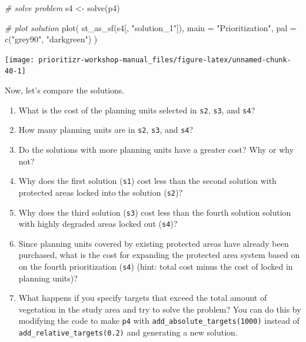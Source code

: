 \documentclass[
  12pt,
]{book}
\makeatletter
\newenvironment{Shaded}{\begin{snugshade}}{\end{snugshade}}
\newcommand{\AttributeTok}[1]{\textcolor[rgb]{0.77,0.63,0.00}{#1}}
\newcommand{\CommentTok}[1]{\textcolor[rgb]{0.56,0.35,0.01}{\textit{#1}}}
\newcommand{\FunctionTok}[1]{\textcolor[rgb]{0.00,0.00,0.00}{#1}}
\newcommand{\NormalTok}[1]{#1}
\newcommand{\OtherTok}[1]{\textcolor[rgb]{0.56,0.35,0.01}{#1}}
\newcommand{\StringTok}[1]{\textcolor[rgb]{0.31,0.60,0.02}{#1}}
\providecommand{\tightlist}{%
  \setlength{\itemsep}{0pt}\setlength{\parskip}{0pt}}
\newenvironment{kframe}{%
\medskip{}
\setlength{\fboxsep}{.8em}
 \def\at@end@of@kframe{}%
 \ifinner\ifhmode%
  \def\at@end@of@kframe{\end{minipage}}%
  \begin{minipage}{\columnwidth}%
 \fi\fi%
 \def\FrameCommand##1{\hskip\@totalleftmargin \hskip-\fboxsep
 \colorbox{shadecolor}{##1}\hskip-\fboxsep
     \hskip-\linewidth \hskip-\@totalleftmargin \hskip\columnwidth}%
 \MakeFramed {\advance\hsize-\width
   \@totalleftmargin\z@ \linewidth\hsize
   \@setminipage}}%
 {\par\unskip\endMakeFramed%
 \at@end@of@kframe}
\newenvironment{rmdblock}[1]
  {
  \begin{itemize}
  \renewcommand{\labelitemi}{
    \raisebox{-.7\height}[0pt][0pt]{
      {\setkeys{Gin}{width=3em,keepaspectratio}\texttt{[image: images/\#1]}}
    }
  }
  \setlength{\fboxsep}{1em}
  \begin{kframe}
  \item
  }
  {
  \end{kframe}
  \end{itemize}
  }
\newenvironment{rmdquestion}
  {\begin{rmdblock}{question}}
  {\end{rmdblock}}
\makeatother
\begin{document}
\begin{Shaded}
\begin{Highlighting}[]
\CommentTok{\# solve problem}
\NormalTok{s4 }\OtherTok{\textless{}{-}} \FunctionTok{solve}\NormalTok{(p4)}

\CommentTok{\# plot solution}
\FunctionTok{plot}\NormalTok{(}
  \FunctionTok{st\_as\_sf}\NormalTok{(s4[, }\StringTok{"solution\_1"}\NormalTok{]), }\AttributeTok{main =} \StringTok{"Prioritization"}\NormalTok{,}
  \AttributeTok{pal =} \FunctionTok{c}\NormalTok{(}\StringTok{"grey90"}\NormalTok{, }\StringTok{"darkgreen"}\NormalTok{)}
\NormalTok{)}
\end{Highlighting}
\end{Shaded}

\begin{center}\texttt{[image: prioritizr-workshop-manual\_files/figure-latex/unnamed-chunk-40-1]} \end{center}

\clearpage

Now, let's compare the solutions.

\begin{rmdquestion}
\begin{enumerate}
\def\labelenumi{\arabic{enumi}.}
\tightlist
\item
  What is the cost of the planning units selected in \texttt{s2}, \texttt{s3}, and \texttt{s4}?
\item
  How many planning units are in \texttt{s2}, \texttt{s3}, and \texttt{s4}?
\item
  Do the solutions with more planning units have a greater cost? Why or why not?
\item
  Why does the first solution (\texttt{s1}) cost less than the second solution with protected areas locked into the solution (\texttt{s2})?
\item
  Why does the third solution (\texttt{s3}) cost less than the fourth solution solution with highly degraded areas locked out (\texttt{s4})?
\item
  Since planning units covered by existing protected areas have already been purchased, what is the cost for expanding the protected area system based on on the fourth prioritization (\texttt{s4}) (hint: total cost minus the cost of locked in planning units)?
\item
  What happens if you specify targets that exceed the total amount of vegetation in the study area and try to solve the problem? You can do this by modifying the code to make \texttt{p4} with \texttt{add\_absolute\_targets(1000)} instead of \texttt{add\_relative\_targets(0.2)} and generating a new solution.
\end{enumerate}
\end{rmdquestion}
\end{document}
